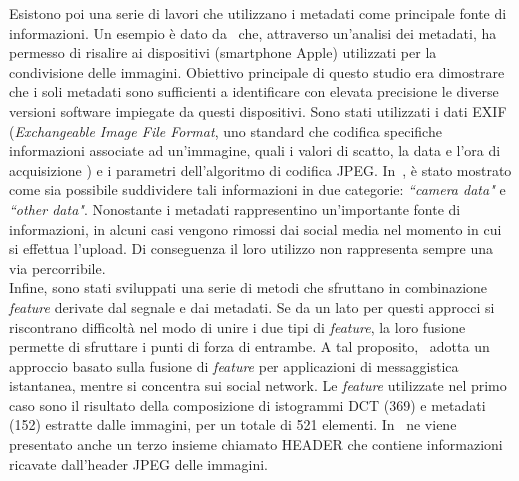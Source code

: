 Esistono poi una serie di lavori che utilizzano i metadati come principale fonte di informazioni. Un esempio è dato da~\cite{mullan2019forensic} che, attraverso un'analisi dei metadati, ha permesso di risalire ai dispositivi (smartphone Apple) utilizzati per la condivisione delle immagini. Obiettivo principale di questo studio era dimostrare che i soli metadati sono sufficienti a identificare con elevata precisione le diverse versioni software impiegate da questi dispositivi. Sono stati utilizzati i dati EXIF (\textit{Exchangeable Image File Format}, uno standard che codifica specifiche informazioni associate ad un'immagine, quali i valori di scatto, la data e l'ora di acquisizione \cite{nasim}) e i parametri dell'algoritmo di codifica JPEG. In~\cite{mullan2019forensic}, è stato mostrato come sia possibile suddividere tali informazioni in due categorie: \textit{“camera data"} e \textit{“other data"}. Nonostante i metadati rappresentino un'importante fonte di informazioni, in alcuni casi vengono rimossi dai social media nel momento in cui si effettua l'upload. Di conseguenza il loro utilizzo non rappresenta sempre una via percorribile.\\
Infine, sono stati sviluppati una serie di metodi che sfruttano in combinazione \textit{feature} derivate dal segnale e dai metadati. Se da un lato per questi approcci si riscontrano difficoltà nel modo di unire i due tipi di \textit{feature}, la loro fusione permette di sfruttare i punti di forza di entrambe. A tal proposito,~\cite{phan2018identifying} adotta un approccio basato sulla fusione di \textit{feature} per applicazioni di messaggistica istantanea, mentre \cite{verde2021multi} si concentra sui social network. Le \textit{feature} utilizzate nel primo caso sono il risultato della composizione di istogrammi DCT (369) e metadati (152) estratte dalle immagini, per un totale di 521 elementi. In~\cite{verde2021multi} ne viene presentato anche un terzo insieme chiamato HEADER che contiene informazioni ricavate dall'header JPEG delle immagini.

